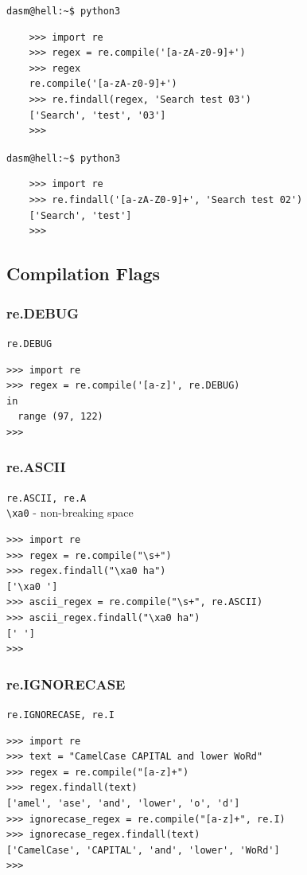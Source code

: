 \documentclass{beamer}
\begin{document}
\begin{frame}[fragile]
    \verb|dasm@hell:~$ python3|
    \begin{lstlisting}
    >>> import re
    >>> regex = re.compile('[a-zA-z0-9]+')
    >>> regex
    re.compile('[a-zA-z0-9]+')
    >>> re.findall(regex, 'Search test 03')
    ['Search', 'test', '03']
    >>>
    \end{lstlisting}
\end{frame}

\begin{frame}[fragile]
    \verb|dasm@hell:~$ python3|
    \begin{lstlisting}
    >>> import re
    >>> re.findall('[a-zA-Z0-9]+', 'Search test 02')
    ['Search', 'test']
    >>>
    \end{lstlisting}
\end{frame}

\subsection{Compilation Flags}
\subsubsection{re.DEBUG}
\begin{frame}[fragile]
\verb/re.DEBUG/
\begin{lstlisting}
>>> import re
>>> regex = re.compile('[a-z]', re.DEBUG)
in
  range (97, 122)
>>>
\end{lstlisting}
\end{frame}

\subsubsection{re.ASCII}
\begin{frame}[fragile]
\verb/re.ASCII, re.A/ \\
\verb/\xa0/ - non-breaking space
\begin{lstlisting}
>>> import re
>>> regex = re.compile("\s+")
>>> regex.findall("\xa0 ha")
['\xa0 ']
>>> ascii_regex = re.compile("\s+", re.ASCII)
>>> ascii_regex.findall("\xa0 ha")
[' ']
>>>
\end{lstlisting}
\end{frame}

\subsubsection{re.IGNORECASE}
\begin{frame}[fragile]
\verb/re.IGNORECASE, re.I/ \\
\begin{lstlisting}
>>> import re
>>> text = "CamelCase CAPITAL and lower WoRd"
>>> regex = re.compile("[a-z]+")
>>> regex.findall(text)
['amel', 'ase', 'and', 'lower', 'o', 'd']
>>> ignorecase_regex = re.compile("[a-z]+", re.I)
>>> ignorecase_regex.findall(text)
['CamelCase', 'CAPITAL', 'and', 'lower', 'WoRd']
>>>
\end{lstlisting}
\end{frame}
\end{document}
